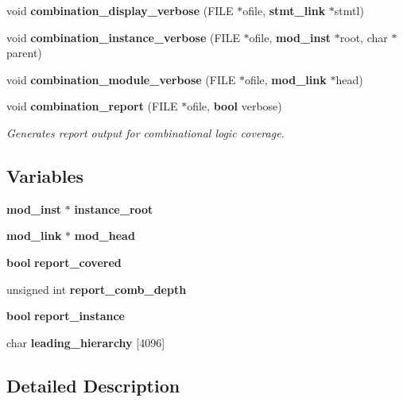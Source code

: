 \begin{CompactItemize}
void {\bf combination\_\-display\_\-verbose} (FILE $\ast$ofile, {\bf stmt\_\-link} $\ast$stmtl)
\item 
void {\bf combination\_\-instance\_\-verbose} (FILE $\ast$ofile, {\bf mod\_\-inst} $\ast$root, char $\ast$parent)
\item 
void {\bf combination\_\-module\_\-verbose} (FILE $\ast$ofile, {\bf mod\_\-link} $\ast$head)
\item 
void {\bf combination\_\-report} (FILE $\ast$ofile, {\bf bool} verbose)
\begin{CompactList}\small\item\em Generates report output for combinational logic coverage.\item\end{CompactList}\end{CompactItemize}
\subsection*{Variables}
\begin{CompactItemize}
\item 
{\bf mod\_\-inst} $\ast$ {\bf instance\_\-root}
\item 
{\bf mod\_\-link} $\ast$ {\bf mod\_\-head}
\item 
{\bf bool} {\bf report\_\-covered}
\item 
unsigned int {\bf report\_\-comb\_\-depth}
\item 
{\bf bool} {\bf report\_\-instance}
\item 
char {\bf leading\_\-hierarchy} [4096]
\end{CompactItemize}


\subsection{Detailed Description}


